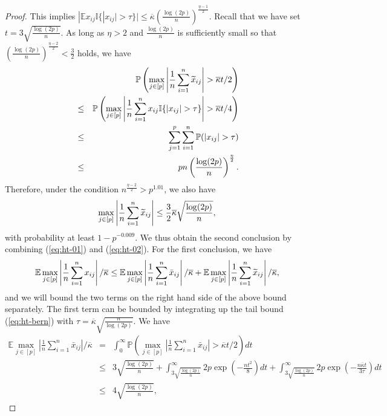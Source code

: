 \begin{proof}
This implies $|\mathbb{E}x_{ij}\mathbb{I}\{|x_{ij}|>\tau\}|\leq \overline{\kappa}\left(\frac{\log (2p)}{n}\right)^{\frac{\eta-1}{2}}$.
Recall that we have set $t=3\sqrt{\frac{\log(2p)}{n}}$. As long as $\eta>2$ and $\frac{\log(2p)}{n}$ is sufficiently small so that $\left(\frac{\log(2p)}{n}\right)^{\frac{\eta-2}{2}}<\frac{3}{2}$ holds, we have
\begin{eqnarray*}
&& \mathbb{P}\left(\max_{j\in[p]}\left|\frac{1}{n}\sum_{i=1}^n\wt{x}_{ij}\right|>\overline{\kappa} t/2\right) \\
&\leq& \mathbb{P}\left(\max_{j\in[p]}\left|\frac{1}{n}\sum_{i=1}^nx_{ij}\mathbb{I}\{|x_{ij}|>\tau\}\right|>\overline{\kappa} t/4\right) \\
&\leq& \sum_{j=1}^p\sum_{i=1}^n\mathbb{P}(|x_{ij}|>\tau) \\
&\leq& pn \left(\frac{\log (2p)}{n}\right)^{\frac{\eta}{2}}.
\end{eqnarray*}
Therefore, under the condition $n^{\frac{\eta-2}{2}}>p^{1.01}$, we also have
\begin{equation}
\max_{j\in[p]}\left|\frac{1}{n}\sum_{i=1}^n\wt{x}_{ij}\right|\leq \frac{3}{2}\overline{\kappa}\sqrt{\frac{\log (2p)}{n}}, \label{eq:ht-02}
\end{equation}
with probability at least $1-p^{-0.009}$. We thus obtain the second conclusion by combining (\ref{eq:ht-01}) and (\ref{eq:ht-02}). For the first conclusion, we have
$$\mathbb{E}\max_{j\in[p]}\left|\frac{1}{n}\sum_{i=1}^n{x}_{ij}\right|/\overline{\kappa}\leq \mathbb{E}\max_{j\in[p]}\left|\frac{1}{n}\sum_{i=1}^n\bar{x}_{ij}\right|/\overline{\kappa}+\mathbb{E}\max_{j\in[p]}\left|\frac{1}{n}\sum_{i=1}^n\widetilde{x}_{ij}\right|/\overline{\kappa},$$
and we will bound the two terms on the right hand side of the above bound separately. The first term can be bounded by integrating up the tail bound (\ref{eq:ht-bern}) with $\tau=\overline{\kappa}\sqrt{\frac{n}{\log(2p)}}$. We have
\begin{eqnarray*}
\mathbb{E}\max_{j\in[p]}\left|\frac{1}{n}\sum_{i=1}^n\bar{x}_{ij}\right|/\overline{\kappa} &=& \int_0^{\infty}\mathbb{P}\left(\max_{j\in[p]}\left|\frac{1}{n}\sum_{i=1}^n\bar{x}_{ij}\right|>\overline{\kappa} t/2\right)dt \\
&\leq& 3\sqrt{\frac{\log (2p)}{n}} + \int_{3\sqrt{\frac{\log (2p)}{n}}}^{\infty}2p\exp\left(-\frac{nt^2}{8}\right)dt + \int_{3\sqrt{\frac{\log (2p)}{n}}}^{\infty}2p\exp\left(-\frac{n\overline{\kappa} t}{3\tau}\right)dt \\
&\leq& 4\sqrt{\frac{\log (2p)}{n}},
\end{eqnarray*}

\end{proof}
